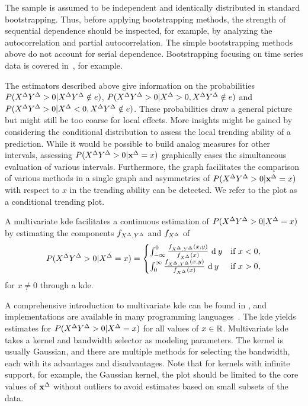 The sample is assumed to be independent and identically distributed in standard bootstrapping.
Thus, before applying bootstrapping methods, the strength of sequential dependence should be inspected, for example, by analyzing the autocorrelation and partial autocorrelation.
The simple bootstrapping methods above do not account for serial dependence. 
Bootstrapping focusing on time series data is covered in~\textcite{Hardle2003,Kreiss2012}, for example.

The estimators described above give information on the probabilities $P(X^{\Delta} Y^{\Delta} > 0 | X^{\Delta} Y^{\Delta} \notin e)$, $P(X^{\Delta} Y^{\Delta} > 0 | X^{\Delta} > 0, X^{\Delta} Y^{\Delta} \notin e)$ and $P(X^{\Delta} Y^{\Delta} > 0 | X^{\Delta} < 0, X^{\Delta} Y^{\Delta} \notin e)$.
These probabilities draw a general picture but might still be too coarse for local effects.
More insights might be gained by considering the conditional distribution to assess the local trending ability of a prediction.
While it would be possible to build analog measures for other intervals, assessing $P(X^{\Delta} Y^{\Delta} > 0 | \mathbf{x}^{\Delta} = x)$ graphically eases the simultaneous evaluation of various intervals.
Furthermore, the graph facilitates the comparison of various methods in a single graph and asymmetries of $P(X^{\Delta} Y^{\Delta} > 0 | \mathbf{x}^{\Delta} = x)$ with respect to $x$ in the trending ability can be detected.
We refer to the plot as a conditional trending plot.

A multivariate \acf{kde} facilitates a continuous estimation of $P(X^{\Delta} Y^{\Delta} > 0 | X^{\Delta} = x)$ by estimating the components $f_{X^{\Delta}, Y^{\Delta}}$ and $f_{X^{\Delta}}$ of
\begin{align*}
P(X^{\Delta} Y^{\Delta} > 0 | X^{\Delta} = x) = \begin{cases}
                                              \int_{-\infty}^0 \frac{f_{X^{\Delta}, Y^{\Delta}}(x, y)}{f_{X^{\Delta}}(x)} \ \textrm{d} \: y & \text{if } x < 0, \\
                                              \int_{0}^{\infty} \frac{f_{X^{\Delta}, Y^{\Delta}}(x, y)}{f_{X^{\Delta}}(x)} \ \textrm{d} \: y & \text{if } x > 0, \\
\end{cases}
\end{align*}
for $x \neq 0$ through a \ac{kde}.

A comprehensive introduction to multivariate \ac{kde} can be found in \textcite{Gramacki2018}, and implementations are available in many programming languages~\parencite[e.g., for  Python in][]{Seabold2010}.
The \ac{kde} yields estimates for $P(X^{\Delta} Y^{\Delta} > 0 | X^{\Delta} = x)$ for all values of $x \in \mathbb{R}$.
Multivariate \ac{kde} takes a kernel and bandwidth selector as modeling parameters. 
The kernel is usually Gaussian, and there are multiple methods for selecting the bandwidth, each with its advantages and disadvantages.
Note that for kernels with infinite support, for example, the Gaussian kernel, the plot should be limited to the core values of $\mathbf{x}^{\Delta}$ without outliers to avoid estimates based on small subsets of the data.

